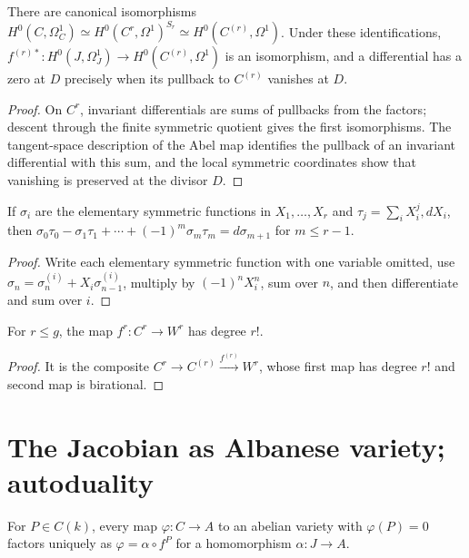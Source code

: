 \begin{proposition}\label{prop:milne-symmetric-differentials}
There are canonical isomorphisms $H^0(C,\Omega_C^1)\simeq H^0(C^r,\Omega^1)^{S_r}\simeq H^0(C^{(r)},\Omega^1)$. Under these identifications, $f^{(r)*}:H^0(J,\Omega_J^1)\to H^0(C^{(r)},\Omega^1)$ is an isomorphism, and a differential has a zero at $D$ precisely when its pullback to $C^{(r)}$ vanishes at $D$.
\end{proposition}
\begin{proof}
On $C^r$, invariant differentials are sums of pullbacks from the factors;
descent through the finite symmetric quotient gives the first isomorphisms.
The tangent-space description of the Abel map identifies the pullback of an
invariant differential with this sum, and the local symmetric coordinates show
that vanishing is preserved at the divisor $D$.
\end{proof}
\begin{lemma}\label{lem:milne-symmetric-differential-identity}
If $\sigma_i$ are the elementary symmetric functions in $X_1,\ldots,X_r$ and $\tau_j=\sum_iX_i^j,dX_i$, then $\sigma_0\tau_0-\sigma_1\tau_1+\cdots+(-1)^m\sigma_m\tau_m=d\sigma_{m+1}$ for $m\le r-1$.
\end{lemma}

\begin{proof}
Write each elementary symmetric function with one variable omitted, use $\sigma_n=\sigma_n^{(i)}+X_i\sigma_{n-1}^{(i)}$, multiply by $(-1)^nX_i^n$, sum over $n$, and then differentiate and sum over $i$.
\end{proof}

\begin{corollary}\label{cor:milne-ordered-abel-degree}
For $r\le g$, the map $f^r:C^r\to W^r$ has degree $r!$.
\end{corollary}

\begin{proof}
It is the composite $C^r\to C^{(r)}\xrightarrow{f^{(r)}}W^r$, whose first map has degree $r!$ and second map is birational.
\end{proof}


\section{The Jacobian as Albanese variety; autoduality}
\begin{proposition}\label{prop:milne-jacobian-albanese}
For $P\in C(k)$, every map $\varphi:C\to A$ to an abelian variety with $\varphi(P)=0$ factors uniquely as $\varphi=\alpha\circ f^P$ for a homomorphism $\alpha:J\to A$.
\end{proposition}

